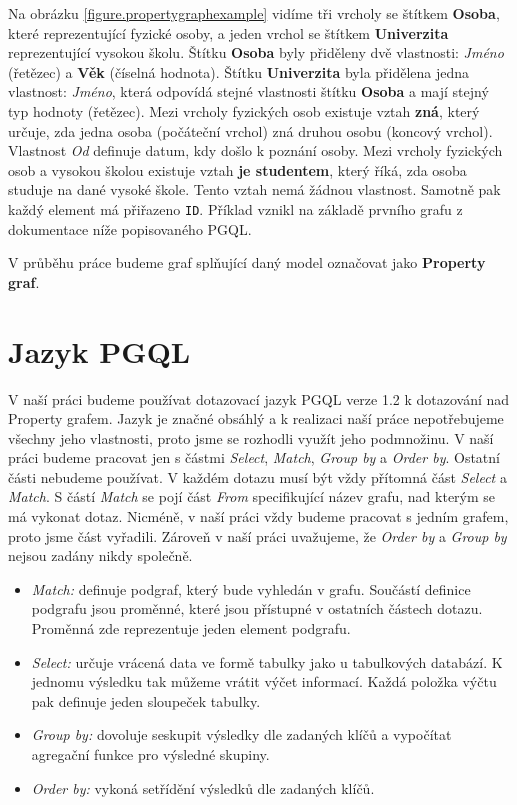 Na obrázku \ref{figure.propertygraphexample} vidíme tři vrcholy se štítkem \textbf{Osoba}, které reprezentující fyzické osoby, a jeden vrchol se štítkem \textbf{Univerzita} reprezentující vysokou školu.
Štítku \textbf{Osoba} byly přiděleny dvě vlastnosti: \textit{Jméno} (řetězec) a \textbf{Věk} (číselná hodnota).
Štítku \textbf{Univerzita} byla přidělena jedna vlastnost: \textit{Jméno}, která odpovídá stejné vlastnosti štítku \textbf{Osoba} a mají stejný typ hodnoty (řetězec).
Mezi vrcholy fyzických osob existuje vztah \textbf{zná}, který určuje, zda jedna osoba (počáteční vrchol) zná druhou osobu (koncový vrchol).
Vlastnost \textit{Od} definuje datum, kdy došlo k poznání osoby.
Mezi vrcholy fyzických osob a vysokou školou existuje vztah \textbf{je studentem}, který říká, zda osoba studuje na dané vysoké škole.
Tento vztah nemá žádnou vlastnost.
Samotně pak každý element má přiřazeno \texttt{ID}.
Příklad vznikl na základě prvního grafu z dokumentace níže popisovaného PGQL.

V průběhu práce budeme graf splňující daný model označovat jako \textbf{Property graf}.

\section{Jazyk PGQL}
\label{req.pgql}

V naší práci budeme používat dotazovací jazyk PGQL \citep{pgql} verze 1.2 k dotazování nad Property grafem.
Jazyk je značné obsáhlý a k realizaci naší práce nepotřebujeme všechny jeho vlastnosti, proto jsme se rozhodli využít jeho podmnožinu.
V naší práci budeme pracovat jen s částmi \textit{Select}, \textit{Match}, \textit{Group by} a \textit{Order by}.
Ostatní části nebudeme používat.
V každém dotazu musí být vždy přítomná část \textit{Select} a \textit{Match}.
S částí \textit{Match} se pojí část \textit{From} specifikující název grafu, nad kterým se má vykonat dotaz.
Nicméně, v naší práci vždy budeme pracovat s jedním grafem, proto jsme část vyřadili. 
Zároveň v naší práci uvažujeme, že \textit{Order by} a \textit{Group by} nejsou zadány nikdy společně.

\begin{itemize}
\item \textit{Match:} definuje podgraf, který bude vyhledán v grafu.
Součástí definice podgrafu jsou proměnné, které jsou přístupné v ostatních částech dotazu.
Proměnná zde reprezentuje jeden element podgrafu.

\item \textit{Select:} určuje vrácená data ve formě tabulky jako u tabulkových databází.
K jednomu výsledku tak můžeme vrátit výčet informací.
Každá položka výčtu pak definuje jeden sloupeček tabulky.

\item \textit{Group by:} dovoluje seskupit výsledky dle zadaných klíčů a vypočítat agregační funkce pro výsledné skupiny.

\item \textit{Order by:} vykoná setřídění výsledků dle zadaných klíčů.
\end{itemize}

